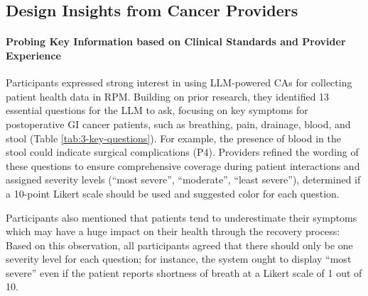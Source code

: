 \subsection{Design Insights from Cancer Providers}
\label{3-PD-provider-insights}
\paragraph{Probing Key Information based on Clinical Standards and Provider Experience}
\label{3-PD-finding-key-info}
Participants expressed strong interest in using LLM-powered CAs for collecting patient health data in RPM. Building on prior research, they identified 13 essential questions for the LLM to ask, focusing on key symptoms for postoperative GI cancer patients, such as breathing, pain, drainage, blood, and stool (Table \ref{tab:3-key-questions}). For example, the presence of blood in the stool could indicate surgical complications (P4). Providers refined the wording of these questions to ensure comprehensive coverage during patient interactions and assigned severity levels (``most severe'', ``moderate'', ``least severe''), determined if a 10-point Likert scale should be used and suggested color for each question.

Participants also mentioned that patients tend to underestimate their symptoms which may have a huge impact on their health through the recovery process:  Based on this observation, all participants agreed that there should only be one severity level for each question; for instance, the system ought to display ``most severe'' even if the patient reports shortness of breath at a Likert scale of 1 out of 10.

